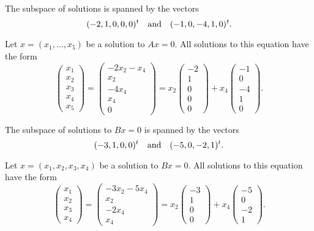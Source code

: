 \ans The subspace of solutions is spanned by the vectors
\[
(-2,1,0,0,0)^t \quad\mbox{and}\quad (-1,0,-4,1,0)^t.
\]

\soln Let $x = (x_1,\dots ,x_5)$ be a solution to $Ax = 0$.  All
solutions to this equation have the form
\[
\left(\begin{array}{r} x_1 \\ x_2 \\ x_3 \\ x_4 \\ x_5
\end{array}\right) = \left(\begin{array}{c} -2x_2 - x_4 \\ x_2 \\
-4x_4 \\ x_4 \\ 0 \end{array}\right) = x_2\left(\begin{array}{r}
-2 \\ 1 \\ 0 \\ 0 \\ 0 \end{array}\right) +
x_4\left(\begin{array}{r} -1 \\ 0 \\ -4 \\ 1 \\ 0
\end{array}\right).
\]

\ans The subspace of solutions to $Bx = 0$ is spanned by the vectors
\[
(-3,1,0,0)^t \quad\mbox{and}\quad (-5,0,-2,1)^t.
\]

\soln Let $x = (x_1,x_2,x_3,x_4)$ be a solution to $Bx = 0$.  All
solutions to this equation have the form
\[
\left(\begin{array}{r} x_1 \\ x_2 \\ x_3 \\ x_4 \end{array}\right)
= \left(\begin{array}{c} -3x_2 - 5x_4 \\ x_2 \\ -2x_4 \\ x_4
\end{array}\right) = x_2\left(\begin{array}{r} -3 \\ 1 \\ 0 \\ 0
\end{array}\right) + x_4\left(\begin{array}{r} -5 \\ 0 \\ -2 \\ 1
\end{array}\right).
\]

